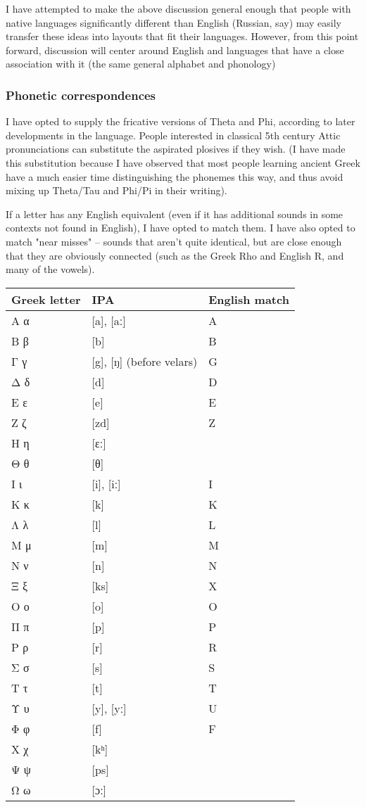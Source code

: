 \documentclass[11pt]{article}
\begin{document}
I have attempted to make the above discussion general enough that people with native languages significantly different than English (Russian, say) may easily transfer these ideas into layouts that fit their languages. However, from this point forward, discussion will center around English and languages that have a close association with it (the same general alphabet and phonology)

\subsubsection{Phonetic correspondences}
\label{sec:org937e19f}

I have opted to supply the fricative versions of Theta and Phi, according to later developments in the language. People interested in classical 5th century Attic pronunciations can substitute the aspirated plosives if they wish. (I have made this substitution because I have observed that most people learning ancient Greek have a much easier time distinguishing the phonemes this way, and thus avoid mixing up Theta/Tau and Phi/Pi in their writing).

If a letter has any English equivalent (even if it has additional sounds in some contexts not found in English), I have opted to match them. I have also opted to match "near misses" -- sounds that aren't quite identical, but are close enough that they are obviously connected (such as the Greek Rho and English R, and many of the vowels).

\begin{center}
\begin{tabular}{lll}
Greek letter & IPA & English match\\
\hline
Α α & [a], [aː] & A\\
Β β & [b] & B\\
Γ γ & [g], [ŋ] (before velars) & G\\
Δ δ & [d] & D\\
Ε ε & [e] & E\\
Ζ ζ & [zd] & Z\\
Η η & [ɛː] & \\
Θ θ & [θ] & \\
Ι ι & [i], [iː] & I\\
Κ κ & [k] & K\\
Λ λ & [l] & L\\
Μ μ & [m] & M\\
Ν ν & [n] & N\\
Ξ ξ & [ks] & X\\
Ο ο & [o] & O\\
Π π & [p] & P\\
Ρ ρ & [r] & R\\
Σ σ & [s] & S\\
Τ τ & [t] & T\\
Υ υ & [y], [yː] & U\\
Φ φ & [f] & F\\
Χ χ & [kʰ] & \\
Ψ ψ & [ps] & \\
Ω ω & [ɔː] & \\
\end{tabular}
\end{center}
\end{document}
